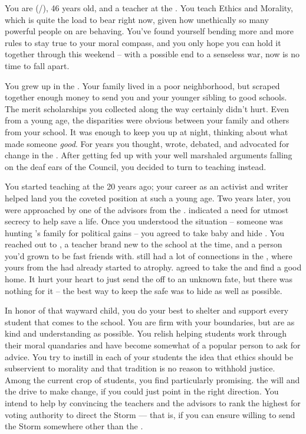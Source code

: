 \documentclass[char]{GL2020}
\begin{document}
\name{\cEthics{}}

You are \cEthics{\full} (\cEthics{\they}/\cEthics{\them}), 46 years old, and a teacher at the \pSchool{}. You teach Ethics and Morality, which is quite the load to bear right now, given how unethically so many powerful people on \pEarth{} are behaving. You've found yourself bending more and more rules to stay true to your moral compass, and you only hope you can hold it together through this weekend -- with a possible end to a senseless war, now is no time to fall apart.

You grew up in the \pTech{}. Your family lived in a poor neighborhood, but scraped together enough money to send you and your younger sibling to good schools. The merit scholarships you collected along the way certainly didn't hurt. Even from a young age, the disparities were obvious between your family and others from your school. It was enough to keep you up at night, thinking about what made someone \emph{good}. For years you thought, wrote, debated, and advocated for change in the \pTech{}. After getting fed up with your well marshaled arguments falling on the deaf ears of the Council, you decided to turn to teaching instead.

You started teaching at the \pSc{} 20 years ago; your career as an activist and writer helped land you the coveted position at such a young age. Two years later, you were approached by one of the advisors from the \pFarm{}. \cEvil{\They} indicated a need for utmost secrecy to help save a life. Once you understood the situation -- someone was hunting \cEvil{\full}'s family for political gains -- you agreed to take \cEvil{\their} baby \cPirateChild{\kid} and hide \cPirateChild{\them}. You reached out to \cPirate{\full}, a teacher brand new to the school at the time, and a person you'd grown to be fast friends with. \cPirate{\They} still had a lot of connections in the \pShip{}, where yours from the \pTech{} had already started to atrophy. \cPirate{} agreed to take the \cPirateChild{\kid} and find \cPirateChild{\them} a good home. It hurt your heart to just send the \cPirateChild{\kid} off to an unknown fate, but there was nothing for it -- the best way to keep the \cPirateChild{\kid} safe was to hide \cPirateChild{\them} as well as possible. 

In honor of that wayward child, you do your best to shelter and support every student that comes to the school. You are firm with your boundaries, but are as kind and understanding as possible. You relish helping students work through their moral quandaries and have become somewhat of a popular person to ask for advice. You try to instill in each of your students the idea that ethics should be subservient to morality and that tradition is no reason to withhold justice. Among the current crop of students, you find \cAmbition{\full} particularly promising. \cAmbition{\They} \cAmbition{\have} the will and the drive to make change, if you could just point \cAmbition{\them} in the right direction. You intend to help \cAmbition{\them} by convincing the \pShip{} teachers and the \pTech{} advisors to rank \cAmbition{\them} the highest for voting authority to direct the Storm — that is, if you can ensure \cAmbition{\theyare} willing to send the Storm somewhere other than the \pShip{}.
\end{document}
